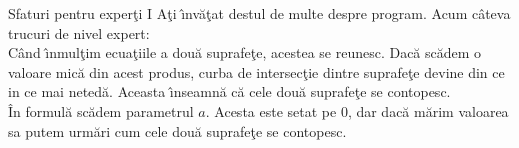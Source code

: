 \begin{surferPage}{Sfaturi pentru exper\c ti I}
A\c ti \^{\i}nv\u a\c tat destul de multe despre program. Acum c\^ateva trucuri de nivel expert:\\
\vspace{0.3cm}
C\^and \^{\i}nmul\c tim ecua\c tiile a dou\u a suprafe\c te, acestea se reunesc. Dac\u a sc\u adem o valoare mic\u a din acest produs, curba de intersec\c tie dintre suprafe\c te devine din ce in ce mai neted\u a. Aceasta \^{\i}nseamn\u a c\u a cele dou\u a suprafe\c te se contopesc.\\
\vspace{0.3cm}
\^In formul\u a sc\u adem parametrul $a$.  Acesta este setat pe 0, dar dac\u a m\u arim valoarea sa putem urm\u ari cum cele dou\u a suprafe\c te se contopesc.
\end{surferPage}